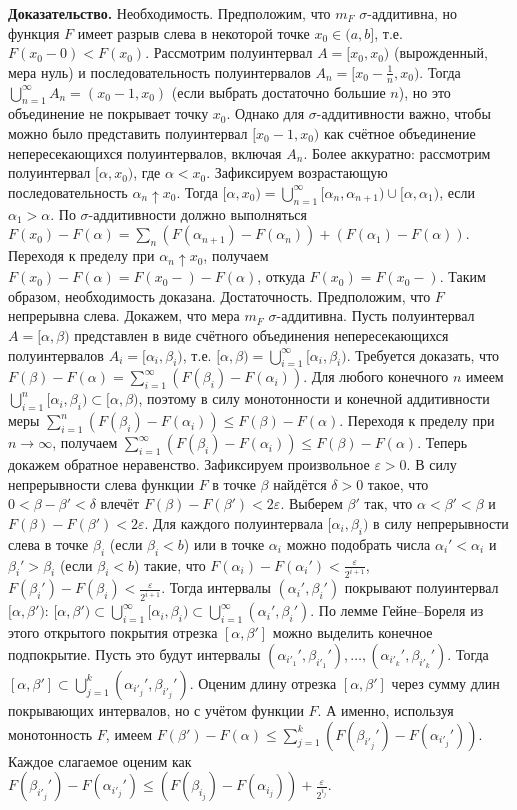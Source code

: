 \documentclass[12pt]{article}
\begin{document}
\textbf{Доказательство.} Необходимость. Предположим, что $m_F$ $\sigma$-аддитивна, но функция $F$ имеет разрыв слева в некоторой точке $x_0\in(a,b]$, т.е. $F(x_0-0)<F(x_0)$. Рассмотрим полуинтервал $A=[x_0,x_0)$ (вырожденный, мера нуль) и последовательность полуинтервалов $A_n=[x_0-\tfrac{1}{n},x_0)$. Тогда $\bigcup_{n=1}^\infty A_n=(x_0-1,x_0)$ (если выбрать достаточно большие $n$), но это объединение не покрывает точку $x_0$. Однако для $\sigma$-аддитивности важно, чтобы можно было представить полуинтервал $[x_0-1,x_0)$ как счётное объединение непересекающихся полуинтервалов, включая $A_n$. Более аккуратно: рассмотрим полуинтервал $[\alpha,x_0)$, где $\alpha<x_0$. Зафиксируем возрастающую последовательность $\alpha_n\uparrow x_0$. Тогда $[\alpha,x_0)=\bigcup_{n=1}^\infty[\alpha_n,\alpha_{n+1})\cup[\alpha,\alpha_1)$, если $\alpha_1>\alpha$. По $\sigma$-аддитивности должно выполняться $F(x_0)-F(\alpha)=\sum_n(F(\alpha_{n+1})-F(\alpha_n))+(F(\alpha_1)-F(\alpha))$. Переходя к пределу при $\alpha_n\uparrow x_0$, получаем $F(x_0)-F(\alpha)=F(x_0-)-F(\alpha)$, откуда $F(x_0)=F(x_0-)$. Таким образом, необходимость доказана. Достаточность. Предположим, что $F$ непрерывна слева. Докажем, что мера $m_F$ $\sigma$-аддитивна. Пусть полуинтервал $A=[\alpha,\beta)$ представлен в виде счётного объединения непересекающихся полуинтервалов $A_i=[\alpha_i,\beta_i)$, т.е. $[\alpha,\beta)=\bigcup_{i=1}^\infty[\alpha_i,\beta_i)$. Требуется доказать, что $F(\beta)-F(\alpha)=\sum_{i=1}^\infty(F(\beta_i)-F(\alpha_i))$. Для любого конечного $n$ имеем $\bigcup_{i=1}^n[\alpha_i,\beta_i)\subset[\alpha,\beta)$, поэтому в силу монотонности и конечной аддитивности меры $\sum_{i=1}^n(F(\beta_i)-F(\alpha_i))\leq F(\beta)-F(\alpha)$. Переходя к пределу при $n\to\infty$, получаем $\sum_{i=1}^\infty(F(\beta_i)-F(\alpha_i))\leq F(\beta)-F(\alpha)$. Теперь докажем обратное неравенство. Зафиксируем произвольное $\varepsilon>0$. В силу непрерывности слева функции $F$ в точке $\beta$ найдётся $\delta>0$ такое, что $0<\beta-\beta'<\delta$ влечёт $F(\beta)-F(\beta')<2\varepsilon$. Выберем $\beta'$ так, что $\alpha<\beta'<\beta$ и $F(\beta)-F(\beta')<2\varepsilon$. Для каждого полуинтервала $[\alpha_i,\beta_i)$ в силу непрерывности слева в точке $\beta_i$ (если $\beta_i<b$) или в точке $\alpha_i$ можно подобрать числа $\alpha_i'<\alpha_i$ и $\beta_i'>\beta_i$ (если $\beta_i<b$) такие, что $F(\alpha_i)-F(\alpha_i')<\tfrac{\varepsilon}{2^{i+1}}$, $F(\beta_i')-F(\beta_i)<\tfrac{\varepsilon}{2^{i+1}}$. Тогда интервалы $(\alpha_i',\beta_i')$ покрывают полуинтервал $[\alpha,\beta')$: $[\alpha,\beta')\subset\bigcup_{i=1}^\infty[\alpha_i,\beta_i)\subset\bigcup_{i=1}^\infty(\alpha_i',\beta_i')$. По лемме Гейне–Бореля из этого открытого покрытия отрезка $[\alpha,\beta']$ можно выделить конечное подпокрытие. Пусть это будут интервалы $(\alpha_{i'_1}',\beta_{i'_1}'),\dots,(\alpha_{i'_k}',\beta_{i'_k}')$. Тогда $[\alpha,\beta']\subset\bigcup_{j=1}^k(\alpha_{i'_j}',\beta_{i'_j}')$. Оценим длину отрезка $[\alpha,\beta']$ через сумму длин покрывающих интервалов, но с учётом функции $F$. А именно, используя монотонность $F$, имеем $F(\beta')-F(\alpha)\leq\sum_{j=1}^k(F(\beta_{i'_j}')-F(\alpha_{i'_j}'))$. Каждое слагаемое оценим как $F(\beta_{i'_j}')-F(\alpha_{i'_j}')\leq(F(\beta_{i_j})-F(\alpha_{i_j}))+\tfrac{\varepsilon}{2^{i_j}}$. 
\end{document}
